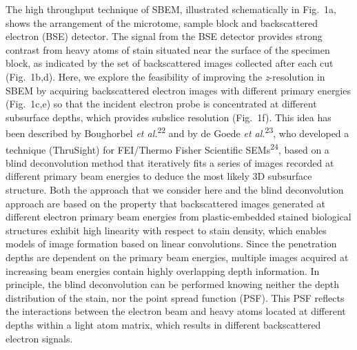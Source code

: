 \documentclass{article}
\newcommand{\cit}[1]{\textsuperscript{#1}}
\begin{document}
The high throughput technique of SBEM, illustrated schematically in Fig.~1a, shows the arrangement of the microtome, sample block and backscattered electron (BSE) detector. The signal from the BSE detector provides strong contrast from heavy atoms of stain situated near the surface of the specimen block, as indicated by the set of backscattered images collected after each cut (Fig.~1b,d). Here, we explore the feasibility of improving the \emph{z}-resolution in SBEM by acquiring backscattered electron images with different primary energies (Fig.~1c,e) so that the incident electron probe is concentrated at different subsurface depths, which provides subslice resolution (Fig.~1f). This idea has been described by Boughorbel \emph{et al.}\cit{22} and by de Goede \emph{et al.}\cit{23}, who developed a technique (ThruSight) for FEI/Thermo Fisher Scientific SEMs\cit{24}, based on a blind deconvolution method that iteratively fits a series of images recorded at different primary beam energies to deduce the most likely 3D subsurface structure. Both the approach that we consider here and the blind deconvolution approach are based on the property that backscattered images generated at different electron primary beam energies from plastic-embedded stained biological structures exhibit high linearity with respect to stain density, which enables models of image formation based on linear convolutions. Since the penetration depths are dependent on the primary beam energies, multiple images acquired at increasing beam energies contain highly overlapping depth information. In principle, the blind deconvolution can be performed knowing neither the depth distribution of the stain, nor the point spread function (PSF). This PSF reflects the interactions between the electron beam and heavy atoms located at different depths within a light atom matrix, which results in different backscattered electron signals.
\end{document}
